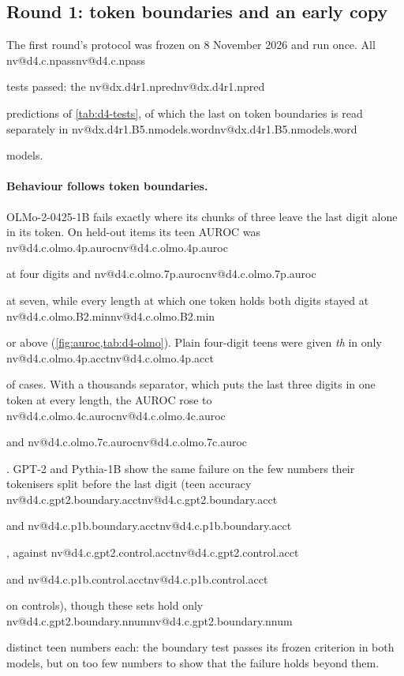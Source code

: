 \documentclass[11pt]{article}
\makeatletter
\newcommand{\nv}[1]{\ifcsname nv@#1\endcsname\csname nv@#1\endcsname\else\PackageError{numbers}{Unknown number key #1}{}\fi}
\newcommand{\sfx}[1]{\textit{#1}}
\newcommand{\olmo}{OLMo-2-0425-1B}
\makeatother
\begin{document}
\subsection{Round 1: token boundaries and an early copy}

The first round's protocol was frozen on 8 November 2026 and run once. All \nv{d4.c.npass} tests passed: the \nv{dx.d4r1.npred} predictions of \cref{tab:d4-tests}, of which the last on token boundaries is read separately in \nv{dx.d4r1.B5.nmodels.word} models.

\paragraph{Behaviour follows token boundaries.} \olmo{} fails exactly where its chunks of three leave the last digit alone in its token. On held-out items its teen AUROC was \nv{d4.c.olmo.4p.auroc} at four digits and \nv{d4.c.olmo.7p.auroc} at seven, while every length at which one token holds both digits stayed at \nv{d4.c.olmo.B2.min} or above (\cref{fig:auroc,tab:d4-olmo}). Plain four-digit teens were given \sfx{th} in only \nv{d4.c.olmo.4p.acct} of cases. With a thousands separator, which puts the last three digits in one token at every length, the AUROC rose to \nv{d4.c.olmo.4c.auroc} and \nv{d4.c.olmo.7c.auroc}. GPT-2 and Pythia-1B show the same failure on the few numbers their tokenisers split before the last digit (teen accuracy \nv{d4.c.gpt2.boundary.acct} and \nv{d4.c.p1b.boundary.acct}, against \nv{d4.c.gpt2.control.acct} and \nv{d4.c.p1b.control.acct} on controls), though these sets hold only \nv{d4.c.gpt2.boundary.nnum} distinct teen numbers each: the boundary test passes its frozen criterion in both models, but on too few numbers to show that the failure holds beyond them.
\end{document}
